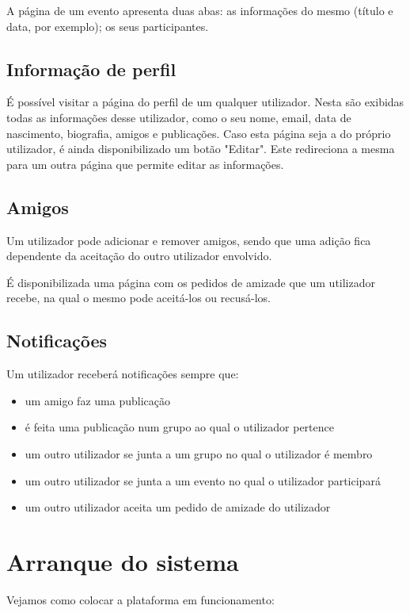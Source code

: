 \documentclass[a4paper]{report}
\begin{document}
    A página de um evento apresenta duas abas: as informações do mesmo (título e data, por exemplo); os seus participantes.


    \subsection{Informação de perfil}
    É possível visitar a página do perfil de um qualquer utilizador. Nesta são exibidas todas as informações desse utilizador, como o seu nome, email, data de nascimento, biografia, amigos e publicações.
    Caso esta página seja a do próprio utilizador, é ainda disponibilizado um botão "Editar". Este redireciona a mesma para um outra página que permite editar as informações.


    \subsection{Amigos}
    Um utilizador pode adicionar e remover amigos, sendo que uma adição fica dependente da aceitação do outro utilizador envolvido.

    É disponibilizada uma página com os pedidos de amizade que um utilizador recebe, na qual o mesmo pode aceitá-los ou recusá-los.


    \subsection{Notificações}
    Um utilizador receberá notificações sempre que:
    \begin{itemize}
        \item um amigo faz uma publicação
        \item é feita uma publicação num grupo ao qual o utilizador pertence
        \item um outro utilizador se junta a um grupo no qual o utilizador é membro
        \item um outro utilizador se junta a um evento no qual o utilizador participará
        \item um outro utilizador aceita um pedido de amizade do utilizador 
    \end{itemize}


	\section{Arranque do sistema} %
	Vejamos como colocar a plataforma em funcionamento:
\end{document}
